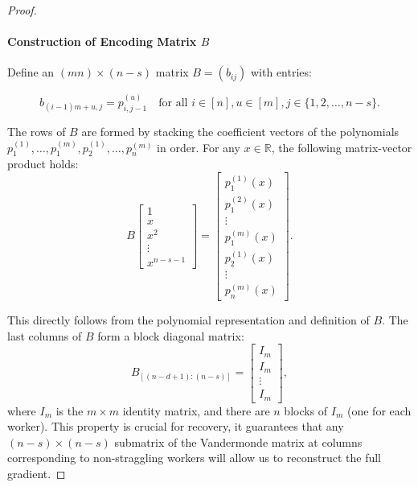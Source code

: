 \documentclass{report}
\theoremstyle{definition}
\begin{document}
\begin{proof}
    \paragraph{Construction of Encoding Matrix $B$} 
    Define an $(mn) \times (n-s)$ matrix $B = (b_{ij})$ with entries:

    \begin{equation}
    b_{(i-1)m+u, j} = p_{i,j-1}^{(u)} \quad \text{for all } i \in [n], u \in [m], j \in \{1, 2, \ldots, n-s\}.
    \end{equation}

    \noindent The rows of $B$ are formed by stacking the coefficient vectors of the polynomials $p_1^{(1)}, \ldots, p_1^{(m)}, p_2^{(1)}, \ldots, p_n^{(m)}$ in order. For any $x \in \mathbb{R}$, the following matrix-vector product holds:
    \begin{equation}
    B \begin{bmatrix} 1 \\ x \\ x^2 \\ \vdots \\ x^{n-s-1} \end{bmatrix} = 
    \begin{bmatrix} 
    p_1^{(1)}(x) \\ p_1^{(2)}(x) \\ \vdots \\ p_1^{(m)}(x) \\ 
    p_2^{(1)}(x) \\ \vdots \\ 
    p_n^{(m)}(x) 
    \end{bmatrix}.
    \end{equation}

    \noindent This directly follows from the polynomial representation and definition of $B$. The last columns of $B$ form a block diagonal matrix:
    \begin{equation}
    B_{[(n-d+1):(n-s)]} = \begin{bmatrix} I_m \\ I_m \\ \vdots \\ I_m \end{bmatrix},
    \end{equation}
    \noindent where $I_m$ is the $m \times m$ identity matrix, and there are $n$ blocks of $I_m$ (one for each worker). This property is crucial for recovery, it guarantees that any $(n-s) \times (n-s)$ submatrix of the Vandermonde matrix at columns corresponding to non-straggling workers will allow us to reconstruct the full gradient.


\end{proof}
\end{document}
